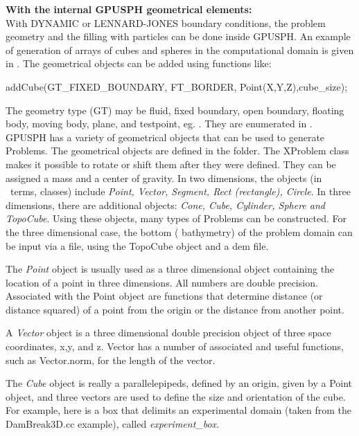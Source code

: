 \documentclass{../GPUSPHtemplate}
\begin{document}
\textbf{With the internal GPUSPH geometrical elements:}\\

With DYNAMIC or LENNARD-JONES boundary conditions, the
problem geometry and the filling with particles can be done
inside GPUSPH. An example of generation of arrays
of cubes and spheres in the computational domain is given in
. 
The geometrical objects can be added using functions like:
\begin{ccode}
addCube(GT_FIXED_BOUNDARY, FT_BORDER,
             Point(X,Y,Z),cube_size);
\end{ccode}
The geometry type (GT) may be fluid, fixed boundary, open boundary, 
floating body, moving body, plane, and testpoint, eg. . 
They are enumerated in .\\


GPUSPH has a variety of geometrical objects that can be used to generate Problems.
The geometrical objects are defined in the  folder.
The XProblem class makes it possible to rotate or shift them after they were defined.
They can be assigned a mass and a center of gravity.
In two dimensions, the objects (in \cpp\ terms, classes) include {\em
Point, Vector, Segment, Rect (rectangle), Circle}. In three
dimensions, there are additional objects: {\em Cone, Cube, Cylinder,
Sphere and TopoCube}. Using these objects, many types of Problems can
be constructed. For the three dimensional case, the bottom (
bathymetry) of the problem domain can be input via a file, using the
TopoCube object and a dem file.


The {\em Point} object is usually used as a three dimensional object
containing the location of a point in three dimensions. All numbers are
double precision. Associated with the Point object are functions that
determine distance (or distance squared) of a point from the origin or
the distance from another point.


A {\em Vector} object is a three dimensional double precision object of
three space coordinates, x,y, and z. Vector has a number of associated
and useful functions, such as Vector.norm, for the length of the vector.


The {\em Cube} object is really a parallelepipeds, defined by an origin,
given by a Point object, and three vectors are used to define the size
and orientation of the cube. For example, here is a box that delimits
an experimental domain (taken from the DamBreak3D.cc example), called
{\em experiment\_box.} \\
\end{document}
